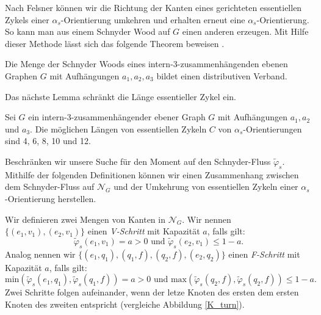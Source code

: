 Nach Felsner können wir die Richtung der Kanten eines gerichteten essentiellen Zykels einer $\alpha_s$-Orientierung umkehren und erhalten erneut eine $\alpha_s$-Orientierung. So kann man aus einem Schnyder Wood auf $G$ einen anderen erzeugen. Mit Hilfe dieser Methode lässt sich das folgende Theorem beweisen \cite{felsner04}.
 
\begin{theorem}
Die Menge der Schnyder Woods eines intern-3-zusammenhängenden ebenen Graphen $G$ mit Aufhängungen $a_1,a_2,a_3$ bildet einen distributiven Verband.
\end{theorem}

Das nächste Lemma schränkt die Länge essentieller Zykel ein.

\begin{lemma}
Sei $G$ ein intern-3-zusammenhängender ebener Graph $G$ mit Aufhängungen $a_1,a_2$ und $a_3$. Die möglichen Längen von essentiellen Zykeln $C$ von $\alpha_s$-Orientierungen sind 4, 6, 8, 10 und 12.
\end{lemma}

Beschränken wir unsere Suche für den Moment auf den Schnyder-Fluss $\tilde{\varphi}_s$. Mithilfe der folgenden Definitionen können wir einen Zusammenhang zwischen dem Schnyder-Fluss auf $\mathcal{N}_G$ und der Umkehrung von essentiellen Zykeln einer $\alpha_s$-Orientierung herstellen.

\begin{definition}
Wir definieren zwei Mengen von Kanten in $\mathcal{N}_G$. Wir nennen $\{(e_1,v_1),(e_2,v_1)\}$ einen \textit{V-Schritt} mit Kapazität $a$, falls gilt: 
$$\tilde{\varphi}_s(e_1,v_1) = a > 0 \text{ und } \tilde{\varphi}_s(e_2,v_1) \leq 1 - a.$$ 
Analog nennen wir $\{(e_1,q_1),(q_1,f),(q_2,f),(e_2,q_2)\}$ einen \textit{F-Schritt} mit Kapazität $a$, falls gilt:
$$\text{min}(\tilde{\varphi}_s(e_1,q_1),\tilde{\varphi}_s(q_1,f)) = a > 0 \text{ und } \text{max}(\tilde{\varphi}_s(q_2,f),\tilde{\varphi}_s(q_2,f)) \leq 1 - a.$$
Zwei Schritte folgen aufeinander, wenn der letze Knoten des ersten dem ersten Knoten des zweiten entspricht (vergleiche Abbildung \ref{K_turn}).
\end{definition}

